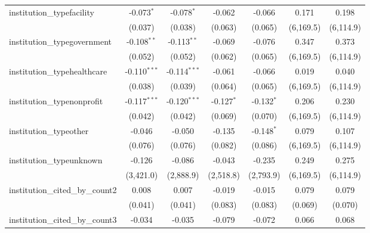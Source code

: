 \begin{tabular}{lcccccc}
   institution\_typefacility             & -0.073$^{*}$   & -0.078$^{*}$   & -0.062        & -0.066        & 0.171          & 0.198\\   
                                         & (0.037)        & (0.038)        & (0.063)       & (0.065)       & (6,169.5)      & (6,114.9)\\   
   institution\_typegovernment           & -0.108$^{**}$  & -0.113$^{**}$  & -0.069        & -0.076        & 0.347          & 0.373\\   
                                         & (0.052)        & (0.052)        & (0.062)       & (0.065)       & (6,169.5)      & (6,114.9)\\   
   institution\_typehealthcare           & -0.110$^{***}$ & -0.114$^{***}$ & -0.061        & -0.066        & 0.019          & 0.040\\   
                                         & (0.038)        & (0.039)        & (0.064)       & (0.065)       & (6,169.5)      & (6,114.9)\\   
   institution\_typenonprofit            & -0.117$^{***}$ & -0.120$^{***}$ & -0.127$^{*}$  & -0.132$^{*}$  & 0.206          & 0.230\\   
                                         & (0.042)        & (0.042)        & (0.069)       & (0.070)       & (6,169.5)      & (6,114.9)\\   
   institution\_typeother                & -0.046         & -0.050         & -0.135        & -0.148$^{*}$  & 0.079          & 0.107\\   
                                         & (0.076)        & (0.076)        & (0.082)       & (0.086)       & (6,169.5)      & (6,114.9)\\   
   institution\_typeunknown              & -0.126         & -0.086         & -0.043        & -0.235        & 0.249          & 0.275\\   
                                         & (3,421.0)      & (2,888.9)      & (2,518.8)     & (2,793.9)     & (6,169.5)      & (6,114.9)\\   
   institution\_cited\_by\_count2        & 0.008          & 0.007          & -0.019        & -0.015        & 0.079          & 0.079\\   
                                         & (0.041)        & (0.041)        & (0.083)       & (0.083)       & (0.069)        & (0.070)\\   
   institution\_cited\_by\_count3        & -0.034         & -0.035         & -0.079        & -0.072        & 0.066          & 0.068\\   

\end{tabular}
